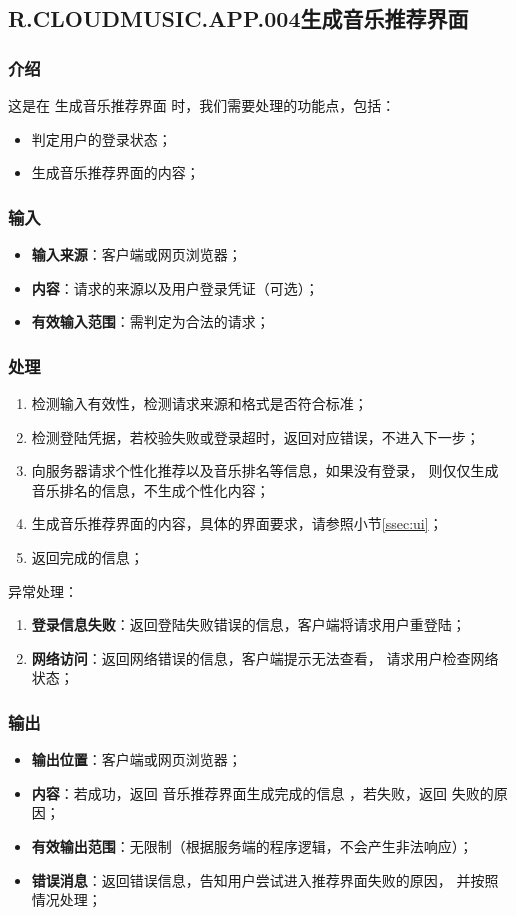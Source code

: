 \subsection{R.CLOUDMUSIC.APP.004生成音乐推荐界面}
\subsubsection{介绍}
	这是在 生成音乐推荐界面 时，我们需要处理的功能点，包括：
	\begin{itemize}
		\item 判定用户的登录状态；
		\item 生成音乐推荐界面的内容；
	\end{itemize}
\subsubsection{输入}
	\begin{itemize}
		\item \textbf{输入来源}：客户端或网页浏览器；
		\item \textbf{内容}：请求的来源以及用户登录凭证（可选）；
		\item \textbf{有效输入范围}：需判定为合法的请求；
	\end{itemize}
\subsubsection{处理}
	\begin{enumerate}
		\item 检测输入有效性，检测请求来源和格式是否符合标准；
		\item 检测登陆凭据，若校验失败或登录超时，返回对应错误，不进入下一步；
		\item 向服务器请求个性化推荐以及音乐排名等信息，如果没有登录，
			则仅仅生成音乐排名的信息，不生成个性化内容；
		\item 生成音乐推荐界面的内容，具体的界面要求，请参照小节\ref{ssec:ui}；
		\item 返回完成的信息；
	\end{enumerate}
	\noindent 异常处理：
	\begin{enumerate}
		\item \textbf{登录信息失败}：返回登陆失败错误的信息，客户端将请求用户重登陆；
		\item \textbf{网络访问}：返回网络错误的信息，客户端提示无法查看，
			请求用户检查网络状态；
	\end{enumerate}
\subsubsection{输出}
\begin{itemize}
	\item \textbf{输出位置}：客户端或网页浏览器；
	\item \textbf{内容}：若成功，返回 音乐推荐界面生成完成的信息 ，若失败，返回 失败的原因；
	\item \textbf{有效输出范围}：无限制（根据服务端的程序逻辑，不会产生非法响应）；
	\item \textbf{错误消息}：返回错误信息，告知用户尝试进入推荐界面失败的原因，
		并按照情况处理；
\end{itemize}

